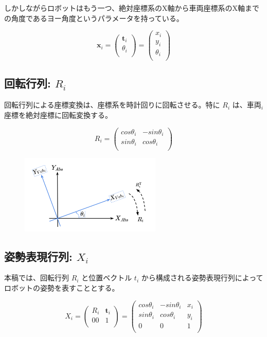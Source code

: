 \documentclass{article}
\begin{document}
しかしながらロボットはもう一つ、絶対座標系のX軸から車両座標系のX軸までの角度であるヨー角度というパラメータを持っている。

\[
\bm{x}_i =
\left(
  \begin{array}{c}
    \bm{t}_i \\
    \theta_i \\
  \end{array}
\right)
=
\left(
  \begin{array}{c}
    x_i \\
    y_i \\
    \theta_i \\
  \end{array}
\right)
\]

\newpage

\subsection{回転行列: $R_i$}

回転行列による座標変換は、座標系を時計回りに回転させる。特に $R_i$ は、車両$_i$座標を絶対座標に回転変換する。

\[
R_i =
\left(
  \begin{array}{ccc}
    cos\theta_i & -sin\theta_i \\
    sin\theta_i &  cos\theta_i \\
  \end{array}
\right)
\]

\begin{figure}[h!]
  \centering
  \includegraphics[width=0.6\textwidth]{2-2_rotation_matrix.png}
\end{figure}

\subsection{姿勢表現行列: $X_i$}

本稿では、回転行列 $R_i$ と位置ベクトル $t_i$ から構成される姿勢表現行列によってロボットの姿勢を表すこととする。

\[
X_i =
\left(
  \begin{array}{ccc}
    R_i & \bm{t}_i \\
     00 &          1 \\
  \end{array}
\right)
=
\left(
  \begin{array}{ccc}
    cos\theta_i & -sin\theta_i & x_i \\
    sin\theta_i &  cos\theta_i & y_i \\
              0 &            0 &   1 \\
  \end{array}
\right)
\]
\end{document}
